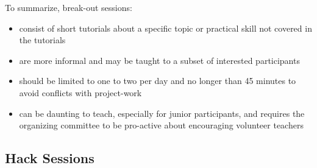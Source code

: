 \documentclass{aastex62}
\begin{document}
To summarize, break-out sessions:
\begin{itemize}
\item consist of short tutorials about a specific topic or practical skill not covered in the tutorials
\item are more informal and may be taught to a subset of interested participants
\item should be limited to one to two per day and no longer than 45 minutes to avoid conflicts with project-work
\item can be daunting to teach, especially for junior participants, and requires the organizing committee to be pro-active about encouraging volunteer teachers
\end{itemize}

\subsection{Hack Sessions}
\end{document}
